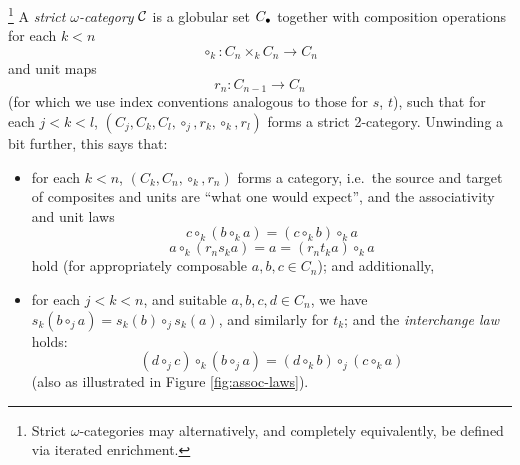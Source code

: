 \begin{definition}\footnote{Strict $\omega$-categories may alternatively, and completely equivalently, be defined via iterated enrichment.}
A \emph{strict $\omega$-category} $\mathcal{C}$ is a globular set $C_\bullet$ together with composition operations for each $k < n$
\[\circ_k \colon C_n \times_k C_n \to C_n\]
and unit maps
\[r_n \colon C_{n-1} \to C_n\]
(for which we use index conventions analogous to those for $s$, $t$),
 such that for each $j < k < l$, $(C_j,C_k,C_l, \circ_j, r_k, \circ_k, r_l)$ forms a strict 2-category.  Unwinding a bit further, this says that:
\begin{itemize}
\item for each $k < n$, $(C_k,C_n, \circ_k, r_n)$ forms a category, i.e.\ the source and target of composites and units are ``what one would expect'', and the associativity and unit laws
\[ c \circ_k (b \circ_k a) = (c \circ_k b) \circ_k a\]
\[ a \circ_k (r_n s_k a) = a = (r_n t_k a) \circ_k a\]
hold (for appropriately composable $a, b, c \in C_n$); and additionally,
\item for each $j < k < n$, and suitable $a,b,c,d \in C_n$, we have $s_k(b \circ_j a) = s_k(b) \circ_j s_k(a)$, and similarly for $t_k$; and the \emph{interchange law} holds:
\[ (d \circ_j c) \circ_k (b \circ_j a) = (d \circ_k b) \circ_j (c \circ_k a)\]
(also as illustrated in Figure \ref{fig:assoc-laws}). 
\end{itemize}
\end{definition}

